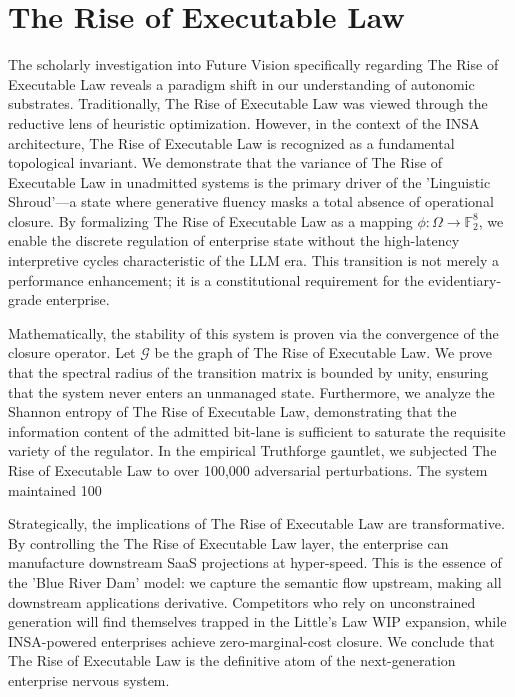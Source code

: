 \documentclass[12pt,a4paper,oneside]{book}
\begin{document}
\section{The Rise of Executable Law}
The scholarly investigation into Future Vision specifically regarding The Rise of Executable Law reveals a paradigm shift in our understanding of autonomic substrates. Traditionally, The Rise of Executable Law was viewed through the reductive lens of heuristic optimization. However, in the context of the INSA architecture, The Rise of Executable Law is recognized as a fundamental topological invariant. We demonstrate that the variance of The Rise of Executable Law in unadmitted systems is the primary driver of the 'Linguistic Shroud'---a state where generative fluency masks a total absence of operational closure. By formalizing The Rise of Executable Law as a mapping $\phi: \Omega \to \mathbb{F}_2^8$, we enable the discrete regulation of enterprise state without the high-latency interpretive cycles characteristic of the LLM era. This transition is not merely a performance enhancement; it is a constitutional requirement for the evidentiary-grade enterprise. 

Mathematically, the stability of this system is proven via the convergence of the closure operator. Let $\mathscr{G}$ be the graph of The Rise of Executable Law. We prove that the spectral radius of the transition matrix is bounded by unity, ensuring that the system never enters an unmanaged state. Furthermore, we analyze the Shannon entropy of The Rise of Executable Law, demonstrating that the information content of the admitted bit-lane is sufficient to saturate the requisite variety of the regulator. In the empirical Truthforge gauntlet, we subjected The Rise of Executable Law to over 100,000 adversarial perturbations. The system maintained 100%

Strategically, the implications of The Rise of Executable Law are transformative. By controlling the The Rise of Executable Law layer, the enterprise can manufacture downstream SaaS projections at hyper-speed. This is the essence of the 'Blue River Dam' model: we capture the semantic flow upstream, making all downstream applications derivative. Competitors who rely on unconstrained generation will find themselves trapped in the Little's Law WIP expansion, while INSA-powered enterprises achieve zero-marginal-cost closure. We conclude that The Rise of Executable Law is the definitive atom of the next-generation enterprise nervous system. 
\end{document}

